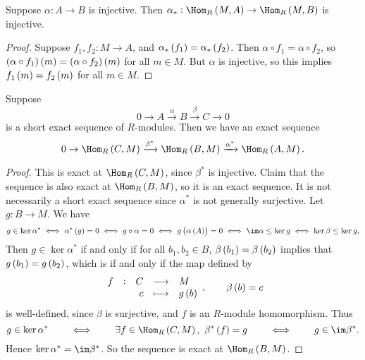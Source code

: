 \begin{proposition}
Suppose $ \alpha : A \to B $ is injective. Then $ \alpha_* : \Hom_R\br{M, A} \to \Hom_R\br{M, B} $ is injective.
\end{proposition}

\begin{proof}
Suppose $ f_1, f_2 : M \to A $, and $ \alpha_*\br{f_1} = \alpha_*\br{f_2} $. Then $ \alpha \circ f_1 = \alpha \circ f_2 $, so $ \br{\alpha \circ f_1}\br{m} = \br{\alpha \circ f_2}\br{m} $ for all $ m \in M $. But $ \alpha $ is injective, so this implies $ f_1\br{m} = f_2\br{m} $ for all $ m \in M $.
\end{proof}

\pagebreak

\begin{proposition}
Suppose
$$ 0 \to A \xrightarrow{\alpha} B \xrightarrow{\beta} C \to 0 $$
is a short exact sequence of $ R $-modules. Then we have an exact sequence
$$ 0 \to \Hom_R\br{C, M} \xrightarrow{\beta^*} \Hom_R\br{B, M} \xrightarrow{\alpha^*} \Hom_R\br{A, M}. $$
\end{proposition}

\begin{proof}
This is exact at $ \Hom_R\br{C, M} $, since $ \beta^* $ is injective. Claim that the sequence is also exact at $ \Hom_R\br{B, M} $, so it is an exact sequence. It is not necessarily a short exact sequence since $ \alpha^* $ is not generally surjective. Let $ g : B \to M $. We have
$$ g \in \ker \alpha^* \iff \alpha^*\br{g} = 0 \iff g \circ \alpha = 0 \iff g\br{\alpha\br{A}} = 0 \iff \im \alpha \le \ker g \iff \ker \beta \le \ker g, $$
Then $ g \in \ker \alpha^* $ if and only if for all $ b_1, b_2 \in B $, $ \beta\br{b_1} = \beta\br{b_2} $ implies that $ g\br{b_1} = g\br{b_2} $, which is if and only if the map defined by
$$ \function[f]{C}{M}{c}{g\br{b}}, \qquad \beta\br{b} = c $$
is well-defined, since $ \beta $ is surjective, and $ f $ is an $ R $-module homomorphism. Thus
$$ g \in \ker \alpha^* \qquad \iff \qquad \exists f \in \Hom_R\br{C, M}, \ \beta^*\br{f} = g \qquad \iff \qquad g \in \im \beta^*. $$
Hence $ \ker \alpha^* = \im \beta^* $. So the sequence is exact at $ \Hom_R\br{B, M} $.
\end{proof}


